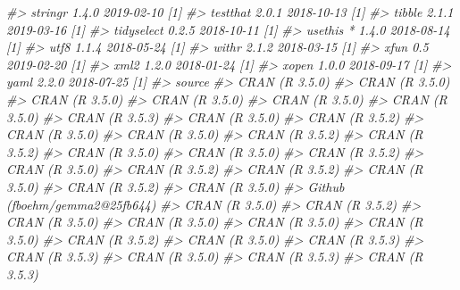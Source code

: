 \documentclass[oneside]{book}\usepackage[]{graphicx}\usepackage[]{color}
\newenvironment{Shaded}{\begin{snugshade}}{\end{snugshade}}
\newcommand{\CommentTok}[1]{\textcolor[rgb]{0.56,0.35,0.01}{\textit{#1}}}
\begin{document}
\begin{Shaded}
\begin{Highlighting}[]
\CommentTok{#>    stringr          1.4.0      2019-02-10 [1]}
\CommentTok{#>    testthat         2.0.1      2018-10-13 [1]}
\CommentTok{#>    tibble           2.1.1      2019-03-16 [1]}
\CommentTok{#>    tidyselect       0.2.5      2018-10-11 [1]}
\CommentTok{#>    usethis        * 1.4.0      2018-08-14 [1]}
\CommentTok{#>    utf8             1.1.4      2018-05-24 [1]}
\CommentTok{#>    withr            2.1.2      2018-03-15 [1]}
\CommentTok{#>    xfun             0.5        2019-02-20 [1]}
\CommentTok{#>    xml2             1.2.0      2018-01-24 [1]}
\CommentTok{#>    xopen            1.0.0      2018-09-17 [1]}
\CommentTok{#>    yaml             2.2.0      2018-07-25 [1]}
\CommentTok{#>  source                             }
\CommentTok{#>  CRAN (R 3.5.0)                     }
\CommentTok{#>  CRAN (R 3.5.0)                     }
\CommentTok{#>  CRAN (R 3.5.0)                     }
\CommentTok{#>  CRAN (R 3.5.0)                     }
\CommentTok{#>  CRAN (R 3.5.0)                     }
\CommentTok{#>  CRAN (R 3.5.0)                     }
\CommentTok{#>  CRAN (R 3.5.3)                     }
\CommentTok{#>  CRAN (R 3.5.0)                     }
\CommentTok{#>  CRAN (R 3.5.2)                     }
\CommentTok{#>  CRAN (R 3.5.0)                     }
\CommentTok{#>  CRAN (R 3.5.0)                     }
\CommentTok{#>  CRAN (R 3.5.2)                     }
\CommentTok{#>  CRAN (R 3.5.2)                     }
\CommentTok{#>  CRAN (R 3.5.0)                     }
\CommentTok{#>  CRAN (R 3.5.0)                     }
\CommentTok{#>  CRAN (R 3.5.2)                     }
\CommentTok{#>  CRAN (R 3.5.0)                     }
\CommentTok{#>  CRAN (R 3.5.2)                     }
\CommentTok{#>  CRAN (R 3.5.2)                     }
\CommentTok{#>  CRAN (R 3.5.0)                     }
\CommentTok{#>  CRAN (R 3.5.2)                     }
\CommentTok{#>  CRAN (R 3.5.0)                     }
\CommentTok{#>  Github (fboehm/gemma2@25fb644)     }
\CommentTok{#>  CRAN (R 3.5.0)                     }
\CommentTok{#>  CRAN (R 3.5.2)                     }
\CommentTok{#>  CRAN (R 3.5.0)                     }
\CommentTok{#>  CRAN (R 3.5.0)                     }
\CommentTok{#>  CRAN (R 3.5.0)                     }
\CommentTok{#>  CRAN (R 3.5.0)                     }
\CommentTok{#>  CRAN (R 3.5.2)                     }
\CommentTok{#>  CRAN (R 3.5.0)                     }
\CommentTok{#>  CRAN (R 3.5.3)                     }
\CommentTok{#>  CRAN (R 3.5.3)                     }
\CommentTok{#>  CRAN (R 3.5.0)                     }
\CommentTok{#>  CRAN (R 3.5.3)                     }
\CommentTok{#>  CRAN (R 3.5.3)                     }

\end{Highlighting}
\end{Shaded}
\end{document}
